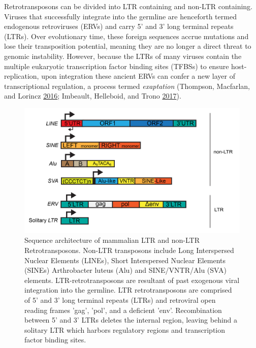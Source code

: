\documentclass[onehalf,12pt]{beavtex}
\begin{document}
  Retrotransposons can be divided into LTR containing and non-LTR
  containing. Viruses that successfully integrate into the germline are
  henceforth termed endogenous retroviruses (ERVs) and carry 5' and 3'
  long terminal repeats (LTRs). Over evolutionary time, these foreign
  sequences accrue mutations and lose their transposition potential,
  meaning they are no longer a direct threat to genomic instability.
  However, because the LTRs of many viruses contain the multiple
  eukaryotic transcription factor binding sites (TFBSs) to ensure
  host-replication, upon integration these ancient ERVs can confer a new
  layer of transcriptional regulation, a process termed \emph{exaptation}
  (Thompson, Macfarlan, and Lorincz
  \protect\hyperlink{ref-ThompsonLongTerminalRepeats2016}{2016}; Imbeault,
  Helleboid, and Trono
  \protect\hyperlink{ref-ImbeaultKRABzincfingerproteins2017}{2017}).
  
  \begin{figure}
  
  {\centering \includegraphics[width=1\linewidth, ]{./figure/introduction/TEs} 
  
  }
  
  \caption[Sequence Architecture of Mammalian Transposable Elements]{Sequence architecture of mammalian LTR and non-LTR Retrotransposons. Non-LTR transposons include Long Interspersed Nuclear Elements (LINEs), Short Interspersed Nuclear Elements (SINEs) Arthrobacter luteus (Alu) and SINE/VNTR/Alu (SVA) elements. LTR-retrotransposons are resultant of past exogenous viral integration into the germline. LTR retrotransposons are comprised of 5' and 3' long terminal repeats (LTRs) and retroviral open reading frames 'gag', 'pol', and a deficient 'env'.  Recombination between 5' and 3' LTRs deletes the internal region, leaving behind a solitary LTR which harbors regulatory regions and transcription factor binding sites.}\label{fig:TEs}
  \end{figure}
  
\end{document}
